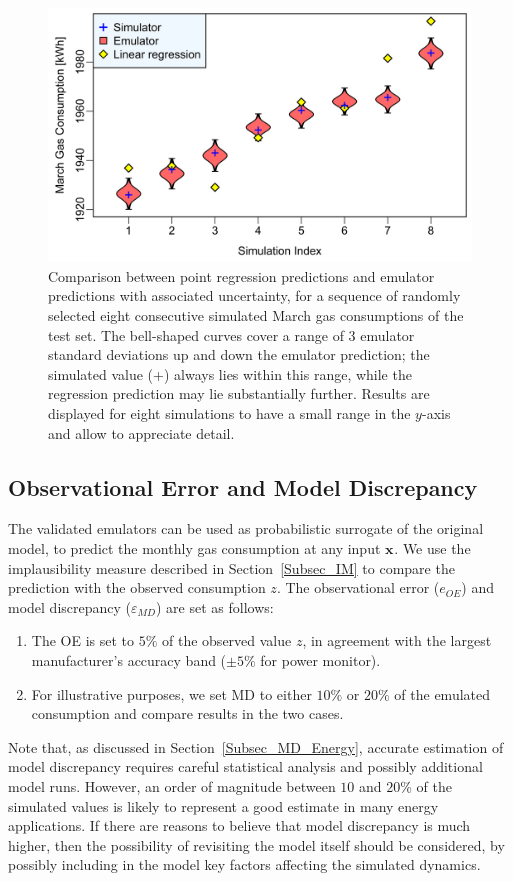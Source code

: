 \documentclass[preprint,12pt, sort&compress]{elsarticle}
\newcommand{\bd}[1]{\boldsymbol{#1}}
\newcommand{\x}[1][]{\bd{x_{#1}}}
\begin{document}
\begin{figure}
\includegraphics[width=\textwidth]{Validation_Plots/Comparison_LR/LR_Mar_82-89.png}
\caption{Comparison between point regression predictions and emulator predictions with associated uncertainty, for a sequence of randomly selected eight consecutive simulated March gas consumptions of the test set. The bell-shaped curves cover a range of 3 emulator standard deviations up and down the emulator prediction; the simulated value (+) always lies within this range, while the regression prediction may lie substantially further. Results are displayed for eight simulations to have a small  range in the $y$-axis and allow to appreciate detail. }
\label{Fig_comparison_LR}
\end{figure}


\subsection{Observational Error and Model Discrepancy}\label{Subsec_OEandMD}

The validated emulators can be used as probabilistic surrogate of the original model, to predict the monthly gas consumption at any input $\x$. We use the implausibility measure described in Section~\ref{Subsec_IM} to compare the prediction with the observed consumption $z$. The observational error ($e_{OE}$) and model discrepancy ($\varepsilon_{MD}$) are set as follows:
\begin{enumerate}
\item The OE is set to $5\%$ of the observed value $z$, in agreement with the largest manufacturer’s accuracy band ($\pm 5\%$ for power monitor).
\item 	For illustrative purposes, we set MD to either $10\%$ or $20\%$ of the emulated consumption and compare results in the two cases.
\end{enumerate}
Note that, as discussed in Section~\ref{Subsec_MD_Energy}, accurate estimation of model discrepancy requires careful statistical analysis and possibly additional model runs. However, an order of magnitude between $10$ and $20$\% of the simulated values is likely to represent a good estimate in many energy applications. If there are reasons to believe that model discrepancy is much higher, then the possibility of revisiting the model itself should be considered, by possibly including in the model key factors affecting the simulated dynamics.
\end{document}
